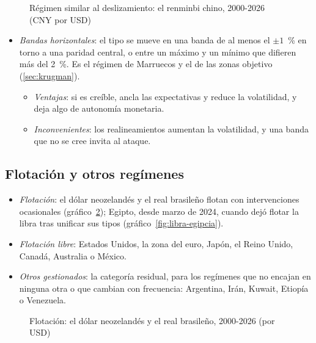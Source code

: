 \documentclass[11pt]{article}
\begin{document}
\begin{figure}[H]
\centering
\caption{Régimen similar al deslizamiento: el renminbi chino, 2000-2026 (CNY por USD)}\label{fig:renminbi}
\end{figure}

\begin{itemize}
\item \emph{Bandas horizontales}: el tipo se mueve en una banda de al menos el $\pm1$~\% en torno a una paridad central, o entre un máximo y un mínimo que difieren más del 2~\%. Es el régimen de Marruecos y el de las zonas objetivo (\ref{sec:krugman}).
  \begin{itemize}
  \item \emph{Ventajas}: si es creíble, ancla las expectativas y reduce la volatilidad, y deja algo de autonomía monetaria.
  \item \emph{Inconvenientes}: los realineamientos aumentan la volatilidad, y una banda que no se cree invita al ataque.
  \end{itemize}
\end{itemize}

\subsection{Flotación y otros regímenes}\label{anexo:regimenes-flotacion}

\begin{itemize}
\item \emph{Flotación}: el dólar neozelandés y el real brasileño flotan con intervenciones ocasionales (gráfico~\ref{fig:flotacion}); Egipto, desde marzo de 2024, cuando dejó flotar la libra tras unificar sus tipos (gráfico~\ref{fig:libra-egipcia})\nocite{CBE2024Flotacion}.
\item \emph{Flotación libre}: Estados Unidos, la zona del euro, Japón, el Reino Unido, Canadá, Australia o México\nocite{FMI2026InformeAnual}.
\item \emph{Otros gestionados}: la categoría residual, para los regímenes que no encajan en ninguna otra o que cambian con frecuencia: Argentina, Irán, Kuwait, Etiopía o Venezuela\nocite{FMI2026InformeAnual}.
\end{itemize}

\begin{figure}[H]
\centering
\caption{Flotación: el dólar neozelandés y el real brasileño, 2000-2026 (por USD)}\label{fig:flotacion}
\end{figure}
\end{document}

